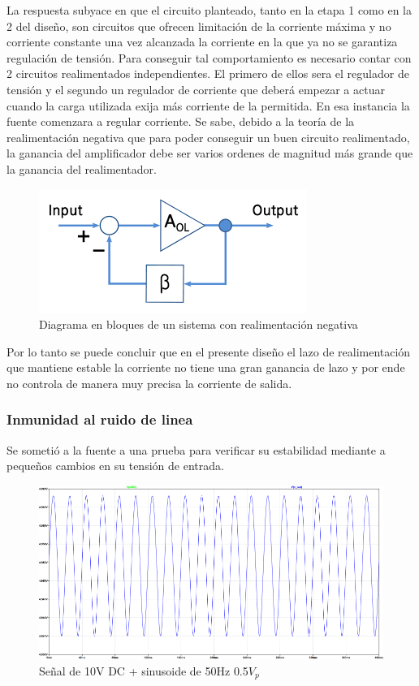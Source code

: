 La respuesta subyace en que el circuito planteado, tanto en la etapa 1 como en la 2 del diseño, son circuitos que ofrecen limitación de la corriente máxima y no corriente constante una vez alcanzada la corriente en la que ya no se garantiza regulación de tensión. Para conseguir tal comportamiento es necesario contar con 2 circuitos  realimentados independientes. El primero de ellos sera el regulador de tensión y el segundo un regulador de corriente que deberá empezar a actuar cuando la carga utilizada exija más corriente de la permitida. En esa instancia la fuente comenzara a regular corriente. Se sabe, debido a la teoría de la realimentación negativa que para poder conseguir un buen circuito realimentado, la ganancia del amplificador debe ser varios ordenes de magnitud más grande que la ganancia del realimentador. 

\begin{figure}[H]
	\centering
	\includegraphics[scale=0.5]{ImagenesEjercicio1/Feedback}
	\caption{Diagrama en bloques de un sistema con realimentación negativa}
	\label{fig:feedback}
\end{figure}
Por lo tanto se puede concluir que en el presente diseño el lazo de realimentación que mantiene estable la corriente no tiene una gran ganancia de lazo y por ende no controla de manera muy precisa la corriente de salida.

\subsubsection{Inmunidad al ruido de linea}
Se sometió a la fuente a una prueba para verificar su estabilidad mediante a pequeños cambios en su tensión de entrada. 

\begin{figure}[H]
	\centering
	\includegraphics[width=0.7\linewidth]{ImagenesEjercicio1/InmunidadRuidoDeLinea}
	\caption{Señal de 10V DC + sinusoide de 50Hz 0.5$V_{p}$}
	\label{fig:inmunidadruidodelinea}
\end{figure}


